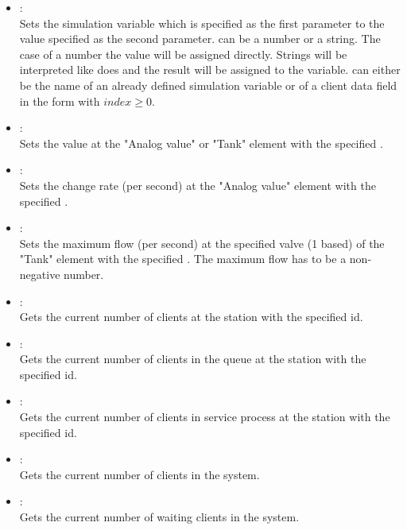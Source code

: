 \begin{itemize}

\item
{}:\\
Sets the simulation variable which is specified as the first parameter to the value specified as the second parameter.  
 can be a number or a string. The case of a number the value will be assigned directly.
Strings will be interpreted like  does and the result will be assigned to the variable. 
can either be the name of an already defined simulation variable or of a client data field in the form
 with $index\ge0$.

\item
{}:\\
Sets the value at the "Analog value" or "Tank" element with the specified .
  
\item
{}:\\
Sets the change rate (per second) at the "Analog value" element with the specified .
  
\item
{}:\\
Sets the maximum flow (per second) at the specified valve (1 based) of the "Tank" element
with the specified . The maximum flow has to be a non-negative number.  

\item
{}:\\
Gets the current number of clients at the station with the specified id.
  
\item
{}:\\
Gets the current number of clients in the queue at the station with the specified id.

\item
{}:\\
Gets the current number of clients in service process at the station with the specified id.

\item
{}:\\
Gets the current number of clients in the system.
  
\item
{}:\\
Gets the current number of waiting clients in the system.

\end{itemize}

